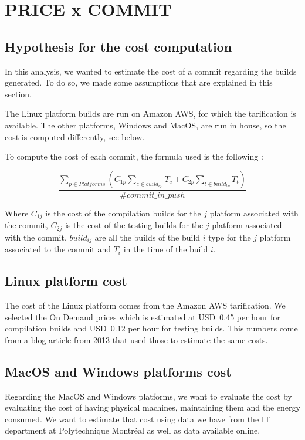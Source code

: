 \section{PRICE x COMMIT}

\subsection{Hypothesis for the cost computation}

In this analysis, we wanted to estimate the cost of a commit regarding the builds generated. To do so, we made some assumptions that are explained in this section.

The Linux platform builds are run on Amazon AWS, for which the tarification is available. The other platforms, Windows and MacOS, are run in house, so the cost is computed differently, see below.

To compute the cost of each commit, the formula used is the following :

$$\frac{\sum_{p\in Platforms} (C_{1p}\sum_{c \in build_{cp}} T_{c} + C_{2p}\sum_{t \in build_{tp}} T_{t})}{\#commit\_in\_push}$$

Where $C_{1j}$ is the cost of the compilation builds for the $j$ platform associated with the commit, $C_{2j}$ is the cost of the testing builds for the $j$ platform associated with the commit, $build_{i j}$ are all the builds of the build $i$ type for the $j$ platform associated to the commit and $T_i$ in the time of the build $i$.

\subsection{Linux platform cost}

The cost of the Linux platform comes from the Amazon AWS tarification. We selected the On Demand prices which is estimated at USD~0.45 per hour for compilation builds and USD~0.12 per hour for testing builds. This numbers come from a blog article from 2013 that used those to estimate the same costs.

\subsection{MacOS and Windows platforms cost}

Regarding the MacOS and Windows platforms, we want to evaluate the cost by evaluating the cost of having physical machines, maintaining them and the energy consumed. We want to estimate that cost using data we have from the IT department at Polytechnique Montréal as well as data available online. 

